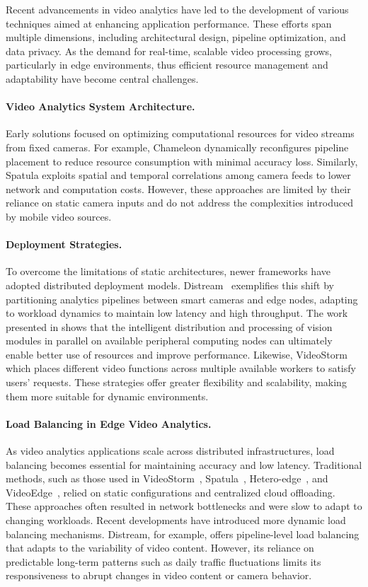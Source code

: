 Recent advancements in video analytics have led to the development of various techniques aimed at enhancing application performance. These efforts span multiple dimensions, including architectural design, pipeline optimization, and data privacy. As the demand for real-time, scalable video processing grows, particularly in edge environments, thus efficient resource management and adaptability have become central challenges.

\paragraph{Video Analytics System Architecture.}
Early solutions focused on optimizing computational resources for video streams from fixed cameras. For example, Chameleon dynamically reconfigures pipeline placement to reduce resource consumption with minimal accuracy loss. Similarly, Spatula exploits spatial and temporal correlations among camera feeds to lower network and computation costs. However, these approaches are limited by their reliance on static camera inputs and do not address the complexities introduced by mobile video sources.

\paragraph{Deployment Strategies.}
To overcome the limitations of static architectures, newer frameworks have adopted distributed deployment models. Distream~\cite{zeng2020distream} exemplifies this shift by partitioning analytics pipelines between smart cameras and edge nodes, adapting to workload dynamics to maintain low latency and high throughput. The work presented in shows that the intelligent distribution and processing of vision modules in parallel on available peripheral computing nodes can ultimately enable better use of resources and improve performance. Likewise, VideoStorm~\cite{201465videostorm} which places different video functions across multiple available workers to satisfy users' requests. These strategies offer greater flexibility and scalability, making them more suitable for dynamic environments.

\paragraph{Load Balancing in Edge Video Analytics.}
As video analytics applications scale across distributed infrastructures, load balancing becomes essential for maintaining accuracy and low latency. Traditional methods, such as those used in VideoStorm~\cite{201465videostorm}, Spatula~\cite{jain2020spatula}, Hetero-edge~\cite{zhang2019hetero}, and VideoEdge~\cite{hung2018videoedge}, relied on static configurations and centralized cloud offloading. These approaches often resulted in network bottlenecks and were slow to adapt to changing workloads.
Recent developments have introduced more dynamic load balancing mechanisms. Distream, for example, offers pipeline-level load balancing that adapts to the variability of video content. However, its reliance on predictable long-term patterns such as daily traffic fluctuations limits its responsiveness to abrupt changes in video content or camera behavior.

